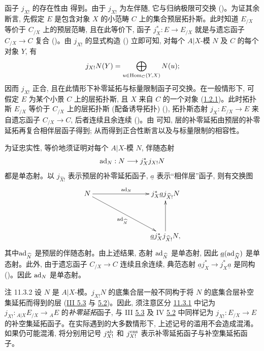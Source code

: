 函子 $j_{X!}$ 的存在性由  得到。由于 $j_{X!}$ 为左伴随, 它与归纳极限可交换 ()。为证其余断言, 先假定 $E$ 是包含对象 $X$ 的小范畴 $C$ 上的集合预层拓扑斯。此时知道 $E_{/X}$ 等价于 $C_{/X}$ 上的预层范畴, 且在此等价下, 函子 $j^{\ast}_X:E\rightarrow E_{/X}$ 就是与遗忘函子 $C_{/X}\rightarrow C$ 复合 ()。由 $j_{X!}$ 的显式构造 () 立即可知, 对每个 $A|X$-模 $N$ 及 $C$ 的每个对象 $Y$, 有
$$
j_{X!}N(Y)=\bigoplus_{u\in \operatorname{Hom}_C(Y,X)}N(u){};
$$
因而 $j_{X!}$ 正合, 且在此情形下补零延拓与标量限制函子可交换。在一般情形下, 可假定 $E$ 为某个小景 $C$ 上的层拓扑斯, 且 $X$ 来自 $C$ 的一个对象 (\hyperref[IV.cor1.2.1]{1.2.1})。此时拓扑斯 $E_{/X}$ 等价于 $C_{/X}$ 上的层拓扑斯 (配备诱导拓扑) (), 拓扑斯态射 $j_X:E_{/X}\rightarrow E$ 来自遗忘函子 $C_{/X}\rightarrow C$, 后者连续且余连续 ()。由  可知, 层的补零延拓由预层的补零延拓再复合相伴层函子得到; 从而得到正合性断言以及与标量限制的相容性。

为证忠实性, 等价地须证明对每个 $A|X$-模 $N$, 伴随态射
$$
\operatorname{ad}_N:N\longrightarrow j^{\ast}_X j_{X!}N
$$
都是单态射。以 $j_{\widehat{X}!}$ 表示预层的补零延拓函子, $\underline{a}$ 表示“相伴层”函子, 则有交换图
\[
\xymatrix@C=2.75cm@R=1.5cm{ N \ar[r]^{\ad_{N}}
\ar[rd]_{\ad_{\hat{N}}} & j^{\ast}_{X} \underline{a}
j_{\widehat{X}!} N \\
                   & \underline{a} j^{\ast}_X j_{\widehat X!} N,\ar[u]
}
\]
其中\pageoriginale $\operatorname{ad}_{\widehat{N}}$ 是预层的伴随态射。由上述结果, 态射 $\operatorname{ad}_{\widehat{N}}$ 是单态射, 因此 $\underline{a}(\operatorname{ad}_{\widehat{N}})$ 是单态射。此外, 由于遗忘函子 $C_{/X}\rightarrow C$ 连续且余连续, 典范态射 $\underline{a}j^{\ast}_X\rightarrow j^{\ast}_X\underline{a}$ 是同构 ()。因此 $\operatorname{ad}_N$ 是单态射。

\begin{enonce*}[remark]{注 11.3.2}
设 $N$ 是 $A|X$-模。$j_{X!}N$ 的底集合层一般不同构于将 $N$ 的底集合层补空集延拓而得到的层 (\hyperref[sga4.exp.III.terminology.5.3]{III 5.3} 与 \hyperref[IV.subsec5.2]{5.2})。因此, 须注意区分 \hyperref[IV.prop11.3.1]{11.3.1} 中记为 $j_{X!}:{}_{A|X}E_{/X}\rightarrow {}_{A}E$ 的\emph{补零延拓}函子, 与 III \hyperref[III.subsec5.3]{5.3} 及 IV \hyperref[IV.subsec5.2]{5.2} 中同样记为 $j_{X!}:E_{/X}\rightarrow E$ 的补空集延拓函子。在实际遇到的大多数情形下, 上述记号的滥用不会造成混淆。如果仍可能混淆, 将分别用记号 $j^{\operatorname{ab}}_{X!}$ 和 $j^{\operatorname{ens}}_{X!}$ 表示补零延拓函子与补空集延拓函子。
\end{enonce*}

